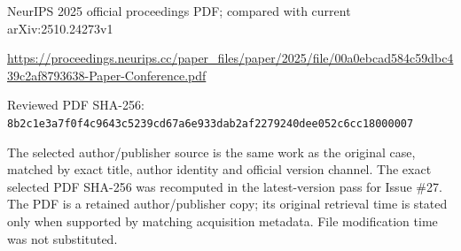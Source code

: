 \documentclass[11pt]{article}
\begin{document}
NeurIPS 2025 official proceedings PDF; compared with current arXiv:2510.24273v1

\url{https://proceedings.neurips.cc/paper_files/paper/2025/file/00a0ebcad584c59dbc439c2af8793638-Paper-Conference.pdf}

Reviewed PDF SHA-256: \nolinkurl{8b2c1e3a7f0f4c9643c5239cd67a6e933dab2af2279240dee052c6cc18000007}

The selected author/publisher source is the same work as the original case, matched by exact title, author identity and official version channel. The exact selected PDF SHA-256 was recomputed in the latest-version pass for Issue \#27. The PDF is a retained author/publisher copy; its original retrieval time is stated only when supported by matching acquisition metadata. File modification time was not substituted.
\end{document}
